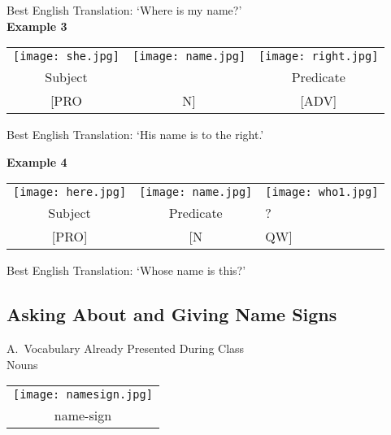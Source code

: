 \documentclass{tufte-book}
\begin{document}
Best English Translation: `Where is my name?'\\

\vspace{0.25cm} \noindent \textbf{Example 3}
\begin{table*}[h!]

\begin{tabular}{c c | c }
\texttt{[image: she.jpg]} & \texttt{[image: name.jpg]} &\texttt{[image: right.jpg]} \\
\footnotesize Subject &  & \footnotesize Predicate \\
\footnotesize [PRO & \footnotesize N] & \footnotesize [ADV] \\



\end{tabular}
\end{table*}

Best English Translation: `His name is to the right.'

\newpage \noindent \textbf{Example 4}
\begin{table*}[h!]

\begin{tabular}{c| c l }
\texttt{[image: here.jpg]} & \texttt{[image: name.jpg]} &\texttt{[image: who1.jpg]} \\
\footnotesize Subject & \footnotesize Predicate & \footnotesize ? \\
\footnotesize [PRO] & \footnotesize [N & \footnotesize QW] \\



\end{tabular}
\end{table*}

Best English Translation: `Whose name is this?'

\subsection{Asking About and Giving Name Signs}

\noindent A.~Vocabulary Already Presented During Class\\

\vspace{0.25cm}\noindent Nouns

\begin{table}[h!]
\begin{tabular}{c}

\texttt{[image: namesign.jpg]}\\
\footnotesize name-sign\\
\end{tabular}
\end{table}
\end{document}
